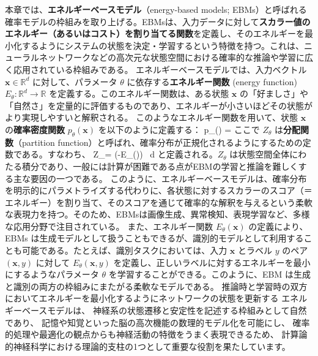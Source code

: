 本章では、\textbf{エネルギーベースモデル}（energy-based models; EBMs）と呼ばれる確率モデルの枠組みを取り上げる。EBMsは、入力データに対して\textbf{スカラー値のエネルギー（あるいはコスト）を割り当てる関数}を定義し、そのエネルギーを最小化するようにシステムの状態を決定・学習するという特徴を持つ。これは、ニューラルネットワークなどの高次元な状態空間における確率的な推論や学習に広く応用されている枠組みである\citep{LeCun2006-dt}。
エネルギーベースモデルでは、入力ベクトル $\mathbf{x} \in \mathbb{R}^d$ に対して、パラメータ $\theta$ に依存する\textbf{エネルギー関数} (energy function) $E_\theta : \mathbb{R}^d \to \mathbb{R}$ を定義する。このエネルギー関数は、ある状態 $\mathbf{x}$ の「好ましさ」や「自然さ」を定量的に評価するものであり、エネルギーが小さいほどその状態がより実現しやすいと解釈される。
このようなエネルギー関数を用いて、状態 $\mathbf{x}$ の\textbf{確率密度関数} $p_\theta(\mathbf{x})$ を以下のように定義する：
p_\theta() = 
ここで $Z_\theta$ は\textbf{分配関数}（partition function）と呼ばれ、確率分布が正規化されるようにするための定数である。すなわち、
Z_\theta = \int \exp(-E_\theta()) \, d
と定義される。$Z_\theta$ は状態空間全体にわたる積分であり、一般には計算が困難である点がEBMの学習と推論を難しくする主な要因の一つである。
このように、エネルギーベースモデルは、確率分布を明示的にパラメトライズする代わりに、各状態に対するスカラーのスコア（＝エネルギー）を割り当て、そのスコアを通じて確率的な解釈を与えるという柔軟な表現力を持つ。そのため、EBMsは画像生成、異常検知、表現学習など、多様な応用分野で注目されている。
また、エネルギー関数 $E_\theta(\mathbf{x})$ の定義により、EBMs は生成モデルとして扱うこともできるが、識別的モデルとして利用することも可能である。たとえば、識別タスクにおいては、入力 $\mathbf{x}$ とラベル $y$ のペア $(\mathbf{x}, y)$ に対して $E_\theta(\mathbf{x}, y)$ を定義し、正しいラベルに対するエネルギーを最小にするようなパラメータ $\theta$ を学習することができる。このように、EBM は生成と識別の両方の枠組みにまたがる柔軟なモデルである。
推論時と学習時の双方においてエネルギーを最小化するようにネットワークの状態を更新する
エネルギーベースモデルは、
神経系の状態遷移と安定性を記述する枠組みとして自然であり、
記憶や知覚といった脳の高次機能の数理的モデル化を可能にし、
確率的処理や最適化の観点からも神経活動の特徴をうまく表現できるため、
計算論的神経科学における理論的支柱の1つとして重要な役割を果たしています。
